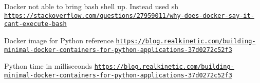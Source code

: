 Docker not able to bring bash shell up. Instead used sh \href{https://stackoverflow.com/questions/27959011/why-does-docker-say-it-cant-execute-bash}{\tt https\+://stackoverflow.\+com/questions/27959011/why-\/does-\/docker-\/say-\/it-\/cant-\/execute-\/bash}

Docker image for Python reference \href{https://blog.realkinetic.com/building-minimal-docker-containers-for-python-applications-37d0272c52f3}{\tt https\+://blog.\+realkinetic.\+com/building-\/minimal-\/docker-\/containers-\/for-\/python-\/applications-\/37d0272c52f3}

Python time in milliseconds \href{https://blog.realkinetic.com/building-minimal-docker-containers-for-python-applications-37d0272c52f3}{\tt https\+://blog.\+realkinetic.\+com/building-\/minimal-\/docker-\/containers-\/for-\/python-\/applications-\/37d0272c52f3} 